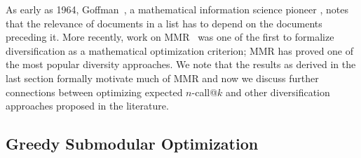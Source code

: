 As early as 1964, Goffman~\cite{goffman64OnRelevanceAsAMeasure}, a
mathematical information science pioneer \cite{harmon08RememberingWG},
notes that the relevance of documents in a list has to depend on the
documents preceding it.  More recently, work on
MMR~\cite{carbonell98MMR} was one of the first to formalize
diversification as a mathematical optimization criterion; MMR has
proved one of the most popular diversity approaches.  We note that the
results as derived in the last section formally motivate much of MMR and now
we discuss further connections between optimizing expected $n$-call@$k$ 
and other diversification approaches proposed in the literature.

\subsection{Greedy Submodular Optimization}


